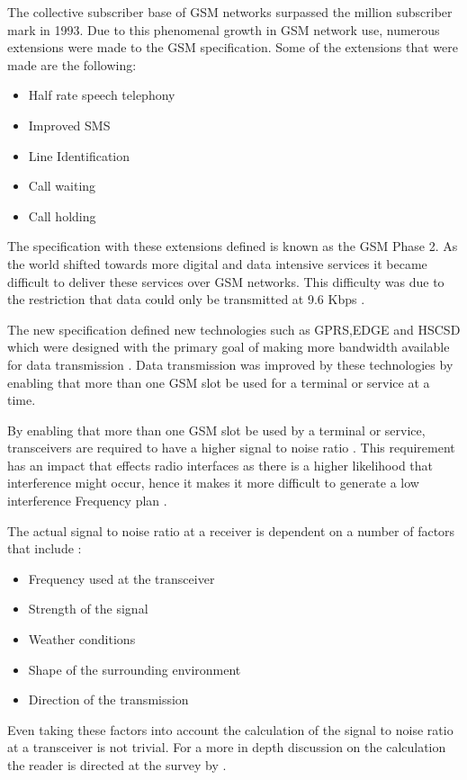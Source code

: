 The collective subscriber base of GSM networks surpassed the million subscriber mark in 1993. Due to this phenomenal growth in GSM network use, numerous extensions were made to the GSM specification. 
Some of the extensions that were made are the following\cite{Eisenblatter}:
\begin{itemize}
\item Half rate speech telephony
\item Improved SMS
\item Line Identification
\item Call waiting
\item Call holding
\end{itemize}
The specification with these extensions defined is known as the GSM Phase 2. As the world shifted towards more digital and data intensive services it became difficult to deliver these services over GSM networks. This difficulty was due to the restriction that data could only be transmitted at 9.6 Kbps \cite{GSM92}.

The new specification defined new technologies such as GPRS,EDGE and HSCSD which were designed with the primary goal of making more bandwidth available for data transmission \cite{GSMArchitectureProtocolsServices}. Data transmission was improved by these technologies by enabling that more than one GSM slot be used for a terminal or service at a time\cite{GSMArchitectureProtocolsServices}.

By enabling that more than one GSM slot be used by a terminal or service, transceivers are required to have a higher signal to noise ratio \cite{GSMArchitectureProtocolsServices}. This requirement has an impact that effects radio interfaces as there is a higher likelihood that interference might occur, hence it makes it more difficult to generate a low interference Frequency plan \cite{Eisenblatter}. 

The actual signal to noise ratio at a receiver is dependent on a number of factors that include \cite{GSMArchitectureProtocolsServices,Karen2004}:
\begin{itemize}
\item Frequency used at the transceiver
\item Strength of the signal
\item Weather conditions
\item Shape of the surrounding environment
\item Direction of the transmission
\end{itemize}
Even taking these factors into account the calculation of the signal to noise ratio at a transceiver is not trivial. For a more in depth discussion on the calculation the reader is directed at the survey by \cite{Karen2004}.

